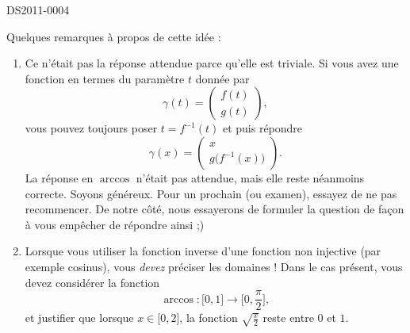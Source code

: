 \begin{corrige}{DS2011-0004}
   
    Quelques remarques à propos de cette idée :
    \begin{enumerate}
        \item
            Ce n'était pas la réponse attendue parce qu'elle est triviale. Si vous avez une fonction en termes du paramètre \( t\) donnée par
            \begin{equation}
                \gamma(t)=\begin{pmatrix}
                    f(t)    \\ 
                    g(t)    
                \end{pmatrix},
            \end{equation}
            vous pouvez toujours poser \( t=f^{-1}(t)\) et puis répondre
            \begin{equation}
                \gamma(x)=\begin{pmatrix}
                    x    \\ 
                    g\big( f^{-1}(x) \big)    
                \end{pmatrix}.
            \end{equation}
            La réponse en \( \arccos\) n'était pas attendue, mais elle reste néanmoins correcte. Soyons généreux. Pour un prochain (ou examen), essayez de ne pas recommencer. De notre côté, nous essayerons de formuler la question de façon à vous empêcher de répondre ainsi ;)

        \item
            Lorsque vous utiliser la fonction inverse d'une fonction non injective (par exemple cosinus), vous \emph{devez} préciser les domaines ! Dans le cas présent, vous devez considérer la fonction
            \begin{equation}
                \arccos\colon \mathopen[ 0 , 1 \mathclose]\to \mathopen[ 0 , \frac{ \pi }{2} \mathclose],
            \end{equation}
            et justifier que lorsque \( x\in\mathopen[ 0 , 2 \mathclose]\), la fonction \( \sqrt{\frac{ x }{ 2 }}\) reste entre \( 0\) et \( 1\).
    \end{enumerate}


\end{corrige}
